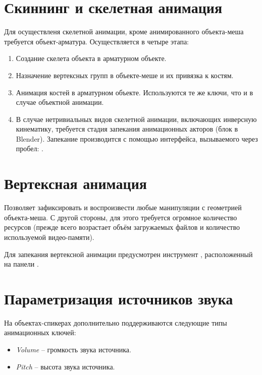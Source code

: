 \documentclass[a4paper,12pt,oneside]{sphinxmanual}
\begin{document}
\section{Скиннинг и скелетная анимация}
\label{animation:id4}
Для осуществленя скелетной анимации, кроме анимированного объекта-меша требуется
объект-арматура. Осуществляется в четыре этапа:
\begin{enumerate}
\item {} 
Создание скелета объекта в арматурном объекте.

\item {} 
Назначение вертексных групп в объекте-меше и их привязка к костям.

\item {} 
Анимация костей в арматурном объекте. Используются те же ключи, что и в случае
объектной анимации.

\item {} 
В случае нетривиальных видов скелетной анимации, включающих инверсную кинематику,
требуется стадия запекания анимационных акторов (блок  в Blender).
Запекание производится с помощью интерфейса, вызываемого через пробел:
.

\end{enumerate}


\section{Вертексная анимация}
\label{animation:id5}
Позволяет зафиксировать и воспроизвести любые манипуляции с геометрией
объекта-меша. С другой стороны, для этого требуется огромное количество
ресурсов (прежде всего возрастает объём загружаемых файлов и количество
используемой видео-памяти).

Для запекания вертексной анимации предусмотрен инструмент , расположенный на панели .


\section{Параметризация источников звука}
\label{animation:id6}
На объектах-спикерах дополнительно поддерживаются следующие типы анимационных
ключей:
\begin{itemize}
\item {} 
\emph{Volume} -- громкость звука источника.

\item {} 
\emph{Pitch} -- высота звука источника.

\end{itemize}
\end{document}
